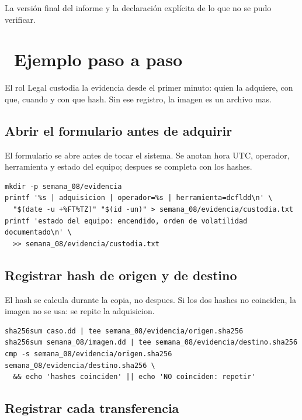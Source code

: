\documentclass[11pt,a4paper]{article}
\newcommand{\iconotexto}[2]{\textcolor{cyanNeon}{\faIcon{#1}}~#2}
\begin{document}
La versión final del informe y la declaración explícita de lo que no se pudo verificar.

\section{\iconotexto{list-ol}{Ejemplo paso a paso}}

El rol Legal custodia la evidencia desde el primer minuto: quien la adquiere, con que, cuando y con que hash. Sin ese registro, la imagen es un archivo mas.

\subsection{Abrir el formulario antes de adquirir}

El formulario se abre antes de tocar el sistema. Se anotan hora UTC, operador, herramienta y estado del equipo; despues se completa con los hashes.

\begin{lstlisting}[style=estiloCodigo]
mkdir -p semana_08/evidencia
printf '%s | adquisicion | operador=%s | herramienta=dcfldd\n' \
  "$(date -u +%FT%TZ)" "$(id -un)" > semana_08/evidencia/custodia.txt
printf 'estado del equipo: encendido, orden de volatilidad documentado\n' \
  >> semana_08/evidencia/custodia.txt
\end{lstlisting}

\subsection{Registrar hash de origen y de destino}

El hash se calcula durante la copia, no despues. Si los dos hashes no coinciden, la imagen no se usa: se repite la adquisicion.

\begin{lstlisting}[style=estiloCodigo]
sha256sum caso.dd | tee semana_08/evidencia/origen.sha256
sha256sum semana_08/imagen.dd | tee semana_08/evidencia/destino.sha256
cmp -s semana_08/evidencia/origen.sha256 semana_08/evidencia/destino.sha256 \
  && echo 'hashes coinciden' || echo 'NO coinciden: repetir'
\end{lstlisting}

\subsection{Registrar cada transferencia}
\end{document}
